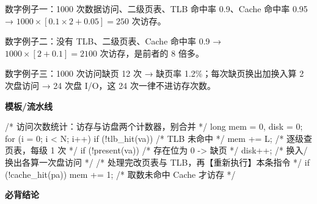 \documentclass[10pt,a4paper]{ctexart}
\begin{document}
数字例子一：1000 次数据访问、二级页表、TLB 命中率 0.9、Cache 命中率 0.95 → $1000\times[0.1\times 2+0.05]=250$ 次访存。

数字例子二：没有 TLB、二级页表、Cache 命中率 0.9 → $1000\times[2+0.1]=2100$ 次访存，是前者的 8 倍多。

数字例子三：1000 次访问缺页 12 次 → 缺页率 1.2\%；每次缺页换出加换入算 2 次盘访问 → 24 次盘 I/O，这 24 次一律不进访存次数。

\textbf{模板/流水线}

\begin{codebox}
/* 访问次数统计：访存与访盘两个计数器，别合并 */
long mem = 0, disk = 0;
for (i = 0; i < N; i++) {
    if (!tlb_hit(va)) {            /* TLB 未命中 */
        mem += L;                  /* 逐级查页表，每级 1 次 */
        if (!present(va)) {        /* 存在位为 0 -> 缺页 */
            disk++;                /* 换入/换出各算一次盘访问 */
            /* 处理完改页表与 TLB，再【重新执行】本条指令 */
        }
    }
    if (!cache_hit(pa)) mem += 1;  /* 取数未命中 Cache 才访存 */
}
\end{codebox}




\textbf{必背结论}
\end{document}
